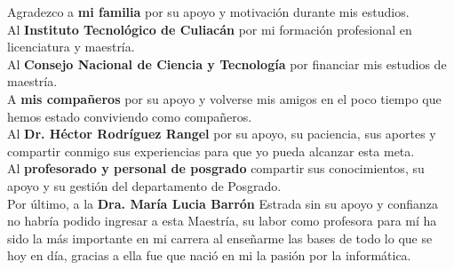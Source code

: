 

\begin{spacing}{1.8}

\noindent Agradezco a \textbf{mi familia} por su apoyo y motivación durante mis estudios.
\\
\noindent Al \textbf{Instituto Tecnológico de Culiacán} por mi formación profesional en licenciatura y maestría.
\\
\noindent Al \textbf{Consejo Nacional de Ciencia y Tecnología} por financiar mis estudios de maestría.
\\
\noindent A \textbf{mis compañeros} por su apoyo y volverse mis amigos en el poco tiempo que hemos estado conviviendo como compañeros.
\\
\noindent Al \textbf{Dr. Héctor Rodríguez Rangel} por su apoyo, su paciencia, sus aportes y compartir conmigo sus experiencias para que yo pueda alcanzar esta meta.
\\
\noindent Al \textbf{profesorado y personal de posgrado} compartir sus conocimientos, su apoyo y su gestión del departamento de Posgrado.
\\
\noindent Por último, a la \textbf{Dra. María Lucia Barrón} Estrada sin su apoyo y confianza no habría podido ingresar a esta Maestría, su labor como profesora para mí ha sido la más importante en mi carrera al enseñarme las bases de todo lo que se hoy en día, gracias a ella fue que nació en mi la pasión por la informática.

\end{spacing} 